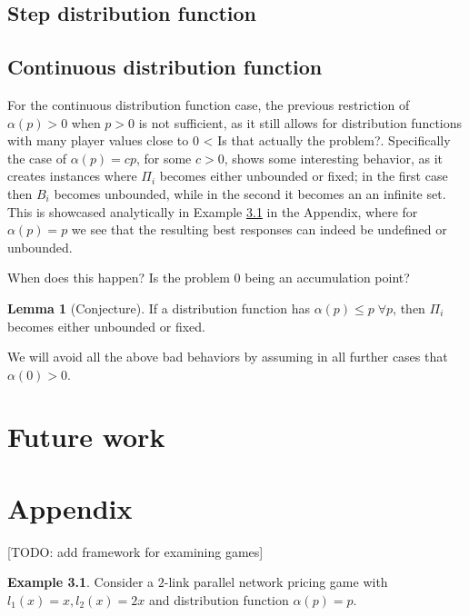 \documentclass[10pt,a4paper]{book}
\theoremstyle{definition}
\newtheorem{lemma}[definition]{Lemma}
\theoremstyle{comment}
\newtheorem{example}[definition]{Example}
\begin{document}
\section{Step distribution function}

\section{Continuous distribution function}

For the continuous distribution function case, the previous restriction of $\alpha(p) > 0$ when $p > 0$ is not sufficient, as it still allows for distribution functions with many player values close to $0$ < Is that actually the problem?.
Specifically the case of $\alpha(p) = cp$, for some $c > 0$, shows some interesting behavior, as it creates instances where $\Pi_i$ becomes either unbounded or fixed; in the first case then $B_i$ becomes unbounded, while in the second it becomes an an infinite set.
This is showcased analytically in Example \ref{example:ap_p} in the Appendix, where for $\alpha(p) = p$ we see that the resulting best responses can indeed be undefined or unbounded.

When does this happen?
Is the problem $0$ being an accumulation point?
\begin{lemma}[Conjecture]
	If a distribution function has $\alpha(p) \le p \; \forall p$, then $\Pi_i$ becomes either unbounded or fixed.
\end{lemma}

We will avoid all the above bad behaviors by assuming in all further cases that $\alpha(0) > 0$.

\cleardoublepage


\chapter{Future work}


\cleardoublepage

{}


\cleardoublepage

{}
\chapter*{Appendix}

[TODO: add framework for examining games]

\begin{example}
	\label{example:ap_p}
	Consider a $2$-link parallel network pricing game with $l_1(x) = x, l_2(x) = 2x$ and distribution function $\alpha(p) = p$.
\end{example}
\end{document}
